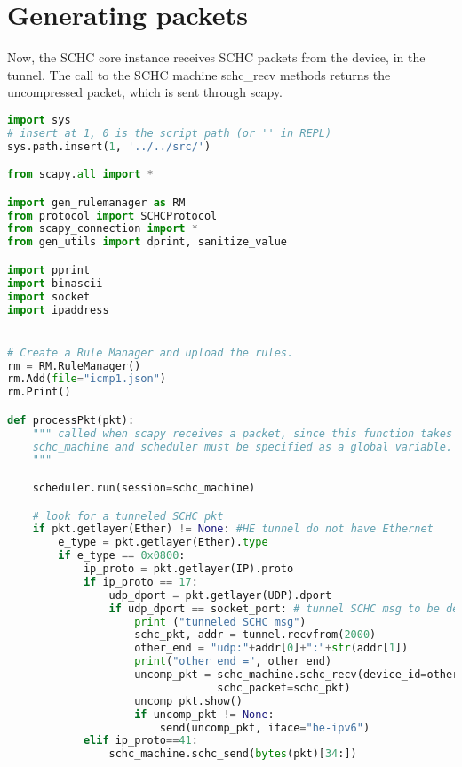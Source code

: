\documentclass[onecolumn,12pt]{book}
\newcounter{c}
\begin{document}
\section{Generating packets}

Now, the SCHC core instance receives SCHC packets from the device, in the tunnel. 
The call to the SCHC machine schc\_recv methods returns the uncompressed packet, which is sent through scapy.

\begin{lstlisting}[language=Python, caption={Program ping\_core2.py}, label=prog-ping-core2, basicstyle=\ttfamily\scriptsize]
import sys
# insert at 1, 0 is the script path (or '' in REPL)
sys.path.insert(1, '../../src/')

from scapy.all import *

import gen_rulemanager as RM
from protocol import SCHCProtocol
from scapy_connection import *
from gen_utils import dprint, sanitize_value

import pprint
import binascii
import socket
import ipaddress


# Create a Rule Manager and upload the rules.
rm = RM.RuleManager()
rm.Add(file="icmp1.json")
rm.Print()

def processPkt(pkt):
    """ called when scapy receives a packet, since this function takes only one argument,
    schc_machine and scheduler must be specified as a global variable.
    """

    scheduler.run(session=schc_machine)

    # look for a tunneled SCHC pkt
    if pkt.getlayer(Ether) != None: #HE tunnel do not have Ethernet
        e_type = pkt.getlayer(Ether).type
        if e_type == 0x0800:
            ip_proto = pkt.getlayer(IP).proto
            if ip_proto == 17:
                udp_dport = pkt.getlayer(UDP).dport
                if udp_dport == socket_port: # tunnel SCHC msg to be decompressed
                    print ("tunneled SCHC msg")                    
                    schc_pkt, addr = tunnel.recvfrom(2000)
                    other_end = "udp:"+addr[0]+":"+str(addr[1])
                    print("other end =", other_end)
                    uncomp_pkt = schc_machine.schc_recv(device_id=other_end,
                                 schc_packet=schc_pkt)
                    uncomp_pkt.show()
                    if uncomp_pkt != None:
                        send(uncomp_pkt, iface="he-ipv6")
            elif ip_proto==41:
                schc_machine.schc_send(bytes(pkt)[34:])


\end{lstlisting}
\end{document}
